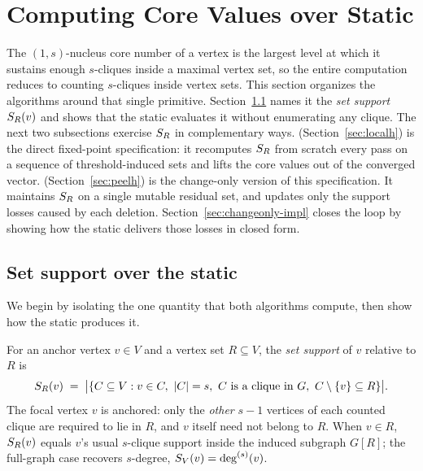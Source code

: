 \section{\texorpdfstring{Computing Core Values over Static \cpi}{Computing Core Values over Static CPI}}\label{sec:hindex}

The $(1,s)$-nucleus core number of a vertex is the largest level at which it sustains enough $s$-cliques inside a maximal vertex set, so the entire computation reduces to counting $s$-cliques inside vertex sets.
%
This section organizes the algorithms around that single primitive.
%
Section~\ref{sec:setsupport} names it the \emph{set support} $S_R(v)$ and shows that the static \cpi{} evaluates it without enumerating any clique.
%
The next two subsections exercise $S_R$ in complementary ways.
%
\spin{} (Section~\ref{sec:localh}) is the direct fixed-point specification: it recomputes $S_R$ from scratch every pass on a sequence of threshold-induced sets and lifts the core values out of the converged vector.
%
\spinStar{} (Section~\ref{sec:peelh}) is the change-only version of this specification.
%
It maintains $S_R$ on a single mutable residual set, and updates only the support losses caused by each deletion.
%
Section~\ref{sec:changeonly-impl} closes the loop by showing how the static \cpi{} delivers those losses in closed form.

\subsection{Set support over the static \cpi}\label{sec:setsupport}

We begin by isolating the one quantity that both algorithms compute, then show how the static \cpi{} produces it.

\begin{definition}\label{def:set-support}
For an anchor vertex $v\in V$ and a vertex set $R\subseteq V$, the \emph{set support} of $v$ relative to $R$ is
\[
  S_R(v) \;=\; \bigl|\{C\subseteq V : v\in C,\ |C|=s,\ C\text{ is a clique in } G,\ C\setminus\{v\}\subseteq R\}\bigr|.
\]
The focal vertex $v$ is anchored: only the \emph{other} $s\!-\!1$ vertices of each counted clique are required to lie in $R$, and $v$ itself need not belong to $R$.
%
When $v\in R$, $S_R(v)$ equals $v$'s usual $s$-clique support inside the induced subgraph $G[R]$; the full-graph case recovers $s$-degree, $S_V(v)=\deg^{(s)}(v)$.
\end{definition}

